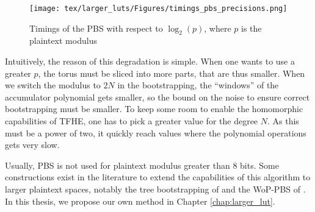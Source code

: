 \begin{figure}
	\centering
	\texttt{[image: tex/larger\_luts/Figures/timings\_pbs\_precisions.png]}
	\caption{Timings of the \gls{PBS} with respect to $\log_2(p)$, where $p$ is the plaintext modulus}
	\label{fig:PBS_perfs}
\end{figure}



Intuitively, the reason of this degradation is simple. When one wants to use a greater $p$, the torus must be sliced into more parts, that are thus smaller. When we switch the modulus to $2N$ in the bootstrapping, the ``windows'' of the accumulator polynomial gets smaller, so the bound on the noise to ensure correct bootstrapping must be smaller. To keep some room to enable the homomorphic capabilities of \gls{TFHE}, one has to pick a greater value for the degree $N$. As this must be a power of two, it quickly reach values where the polynomial operations gets very slow.

Usually, \gls{PBS} is not used for plaintext modulus greater than 8 bits. Some constructions exist in the literature to extend the capabilities of this algorithm to larger plaintext spaces, notably the tree bootstrapping of \cite{TCHES:GuiBorAra21} and the \gls{WoP-PBS} of \cite{AC:CLOT21}. In this thesis, we propose our own method in Chapter \ref{chap:larger_lut}.




